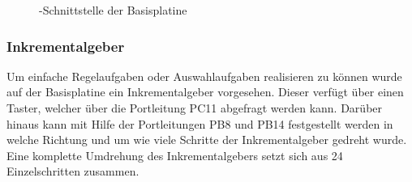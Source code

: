 \begin{figure}[htb]
    \centering
    \qquad
    \qquad
    \caption[\IIC{}-Schnittstelle der Basisplatine]{\IIC{}-Schnittstelle der \gls{Basisplatine}}
    \label{fig:basisplatine-iic}
\end{figure}

\subsubsection{Inkrementalgeber}
Um einfache Regelaufgaben oder Auswahlaufgaben realisieren zu können wurde auf der \gls{Basisplatine} ein Inkrementalgeber vorgesehen. Dieser verfügt über einen Taster, welcher über die Portleitung PC11 abgefragt werden kann. Darüber hinaus kann mit Hilfe der Portleitungen PB8 und PB14 festgestellt werden in welche Richtung und um wie viele Schritte der Inkrementalgeber gedreht wurde. Eine komplette Umdrehung des Inkrementalgebers setzt sich aus 24 Einzelschritten zusammen.

